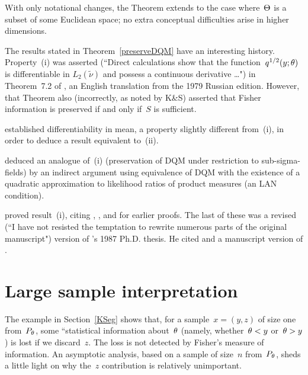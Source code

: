 \documentclass[aos]{imsart}
\def\subheading#1{\medskip\noindent{\normalfont\bfseries #1}}
\theoremstyle{plain}
\theoremstyle{remark}
\begin{document}
With only notational changes, the  Theorem extends to the case
where~$\Theta$ is a subset of some Euclidean space; no extra conceptual
difficulties arise in higher dimensions.

\subheading{Credit where credit is due.}
The results stated in Theorem~\ref{preserveDQM} have an interesting history. Property~(i) was asserted (``Direct calculations show that the function~$q^{1/2}(y;\theta)$ is differentiable in $L_2(\widetilde\nu)$ and possess a continuous derivative \dots") in Theorem~7.2 of 
\citet[Chapter~I, page~70]{Ibragimov:Hasminskii:81book}, an English translation from the 1979 Russian edition. However, that Theorem also (incorrectly, as noted by K\&S) asserted that Fisher information is preserved if and only if~$S$ is sufficient.

\citet[pages~19--21]{Pitman1979book} established differentiability in mean, a property slightly different from~(i), in order to deduce a result equivalent to~(ii).

\citet[Section~7]{Lecam:Yang:88AS} deduced an  analogue of~(i)  (preservation
of DQM under restriction to sub-sigma-fields) by an indirect argument using
equivalence of DQM with the existence of a quadratic approximation to
likelihood ratios of product measures (an LAN condition). 

\citet[page~461]{BKRW:93book} proved result~(i), citing 
\citet{Ibragimov:Hasminskii:81book},
\citet{Lecam:Yang:88AS}, and 
\citet[Appendix~A3]{vaart:88cwi} for earlier proofs. The last of these was a revised
(``I have not resisted the temptation to rewrite numerous parts of the original manuscript") version of \citeauthor{vaart:88cwi}'s 1987 Ph.D. thesis. He  cited \citet{Lecam:Yang:88AS} and a manuscript version of \citet{BKRW:93book}.





\section{Large sample interpretation}
The example in Section~\ref{KSeg} shows that, for a sample~$x=(y,z)$ of size one from~$P_\theta$, some ``statistical information about~$\theta$ (namely, whether~$\theta<y$ or~$\theta>y$) is lost if we discard~$z$. The loss is not detected by Fisher's measure of information. An asymptotic analysis, based on a sample of size~$n$ from~$P_\theta$, sheds a little light on why the~$z$ contribution is relatively unimportant.
\end{document}
